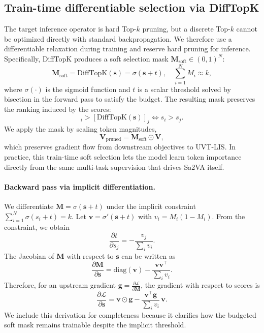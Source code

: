 \subsection{Train-time differentiable selection via DiffTopK}
\label{sec:method_difftopk}
The target inference operator is hard Top-$k$ pruning, but a discrete Top-$k$ cannot be optimized directly with standard backpropagation.
We therefore use a differentiable relaxation during training and reserve hard pruning for inference.
Specifically, DiffTopK produces a soft selection mask $\mathbf{M}_{\mathrm{soft}}\in(0,1)^N$:
\begin{equation}
\mathbf{M}_{\mathrm{soft}} = \mathrm{DiffTopK}(\mathbf{s}) = \sigma(\mathbf{s}+t),\quad \sum_{i=1}^{N} M_i \approx k,
\label{eq:method_difftopk_forward}
\end{equation}
where $\sigma(\cdot)$ is the sigmoid function and $t$ is a scalar threshold solved by bisection in the forward pass to satisfy the budget.
The resulting mask preserves the ranking induced by the scores:
\begin{equation}
[\mathrm{DiffTopK}(\mathbf{s})]_i > [\mathrm{DiffTopK}(\mathbf{s})]_j \Leftrightarrow s_i > s_j.
\label{eq:method_difftopk_mono}
\end{equation}
We apply the mask by scaling token magnitudes,
\begin{equation}
\mathbf{V}_{\mathrm{pruned}} = \mathbf{M}_{\mathrm{soft}} \odot \mathbf{V},
\label{eq:method_pruned_tokens}
\end{equation}
which preserves gradient flow from downstream objectives to UVT-LIS.
In practice, this train-time soft selection lets the model learn token importance directly from the same multi-task supervision that drives Sa2VA itself.

\paragraph{Backward pass via implicit differentiation.}
We differentiate $\mathbf{M}=\sigma(\mathbf{s}+t)$ under the implicit constraint $\sum_{i=1}^{N}\sigma(s_i+t)=k$.
Let $\mathbf{v}=\sigma'(\mathbf{s}+t)$ with $v_i=M_i(1-M_i)$.
From the constraint, we obtain
\begin{equation}
\frac{\partial t}{\partial s_j}=-\frac{v_j}{\sum_i v_i}.
\label{eq:method_implicit_dt}
\end{equation}
The Jacobian of $\mathbf{M}$ with respect to $\mathbf{s}$ can be written as
\begin{equation}
\frac{\partial \mathbf{M}}{\partial \mathbf{s}}=\mathrm{diag}(\mathbf{v})-\frac{\mathbf{v}\mathbf{v}^{\top}}{\sum_i v_i}.
\label{eq:method_implicit_jac}
\end{equation}
Therefore, for an upstream gradient $\mathbf{g}=\frac{\partial \mathcal{L}}{\partial \mathbf{M}}$, the gradient with respect to scores is
\begin{equation}
\frac{\partial \mathcal{L}}{\partial \mathbf{s}} = \mathbf{v}\odot\mathbf{g} - \frac{\mathbf{v}^{\top}\mathbf{g}}{\sum_i v_i}\,\mathbf{v}.
\label{eq:method_implicit_grad}
\end{equation}
We include this derivation for completeness because it clarifies how the budgeted soft mask remains trainable despite the implicit threshold.

